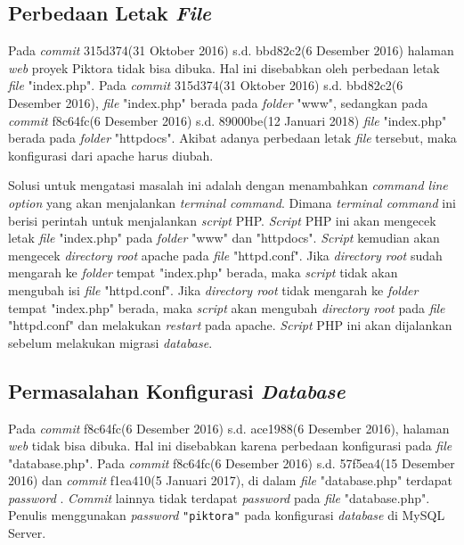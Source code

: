 \subsection{Perbedaan Letak \textit{File}}
\label{subsec:perbedaan_letak_file}
Pada \textit{commit} 315d374(31 Oktober 2016) s.d. bbd82c2(6 Desember 2016) halaman \textit{web} proyek Piktora tidak bisa dibuka. Hal ini disebabkan oleh perbedaan letak \textit{file} "index.php". Pada \textit{commit} 315d374(31 Oktober 2016) s.d. bbd82c2(6 Desember 2016), \textit{file} "index.php" berada pada \textit{folder} "www", sedangkan pada \textit{commit} f8c64fc(6 Desember 2016) s.d. 89000be(12 Januari 2018) \textit{file} "index.php" berada pada \textit{folder} "httpdocs". Akibat adanya perbedaan letak \textit{file} tersebut, maka
konfigurasi dari apache harus diubah.


Solusi untuk mengatasi masalah ini adalah dengan menambahkan \textit{command line option} yang akan menjalankan \textit{terminal command}. Dimana \textit{terminal command} ini berisi perintah untuk menjalankan \textit{script} PHP. \textit{Script} PHP ini akan mengecek letak \textit{file} "index.php" pada \textit{folder} "www" dan "httpdocs". \textit{Script} kemudian akan mengecek \textit{directory root} apache pada \textit{file} "httpd.conf".  Jika \textit{directory root} sudah mengarah ke \textit{folder} tempat "index.php" berada, maka \textit{script} tidak akan mengubah isi \textit{file} "httpd.conf". Jika \textit{directory root} tidak mengarah ke \textit{folder} tempat "index.php" berada, maka \textit{script} akan mengubah \textit{directory root} pada \textit{file} "httpd.conf" dan melakukan \textit{restart} pada apache. \textit{Script} PHP ini akan dijalankan sebelum melakukan migrasi \textit{database}.   


\subsection{Permasalahan Konfigurasi \textit{Database}}
\label{subsec:konfigurasi_database}
Pada \textit{commit} f8c64fc(6 Desember 2016) s.d. ace1988(6 Desember 2016), halaman \textit{web} tidak bisa dibuka. Hal ini disebabkan karena perbedaan konfigurasi pada \textit{file} "database.php". Pada \textit{commit} f8c64fc(6 Desember 2016) s.d. 57f5ea4(15 Desember 2016) dan \textit{commit} f1ea410(5 Januari 2017), di dalam \textit{file} "database.php" terdapat \textit{password} . \textit{Commit} lainnya tidak terdapat \textit{password} pada \textit{file} "database.php". Penulis menggunakan \textit{password} \texttt{"piktora"} pada konfigurasi \textit{database} di MySQL Server.

